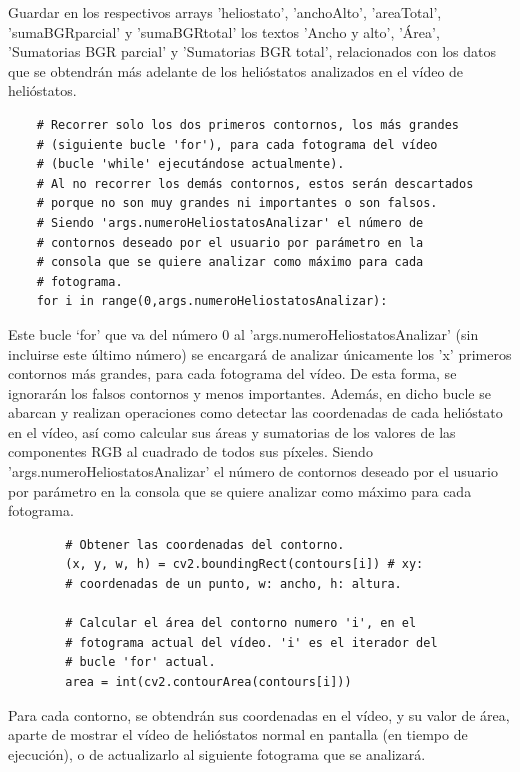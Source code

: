     Guardar en los respectivos arrays 'heliostato', 'anchoAlto', 'areaTotal', 'sumaBGRparcial' y 'sumaBGRtotal' los textos 'Ancho y alto', 'Área', 'Sumatorias BGR parcial' y 'Sumatorias BGR total', relacionados con los datos que se obtendrán más adelante de los helióstatos analizados en el vídeo de helióstatos.\\[20pt]

\begin{lstlisting}
    # Recorrer solo los dos primeros contornos, los más grandes
    # (siguiente bucle 'for'), para cada fotograma del vídeo
    # (bucle 'while' ejecutándose actualmente).
    # Al no recorrer los demás contornos, estos serán descartados
    # porque no son muy grandes ni importantes o son falsos.
    # Siendo 'args.numeroHeliostatosAnalizar' el número de
    # contornos deseado por el usuario por parámetro en la
    # consola que se quiere analizar como máximo para cada
    # fotograma.
    for i in range(0,args.numeroHeliostatosAnalizar):
\end{lstlisting}

Este bucle ‘for’ que va del número 0 al 'args.numeroHeliostatosAnalizar' (sin incluirse este último número) se encargará de analizar únicamente los 'x' primeros contornos más grandes, para cada fotograma del vídeo. De esta forma, se ignorarán los falsos contornos y menos importantes. Además, en dicho bucle se abarcan y realizan operaciones como detectar las coordenadas de cada helióstato en el vídeo, así como calcular sus áreas y sumatorias de los valores de las componentes RGB al cuadrado de todos sus píxeles. Siendo 'args.numeroHeliostatosAnalizar' el número de contornos deseado por el usuario por parámetro en la consola que se quiere analizar como máximo para cada fotograma.\\[20pt]        
        
\begin{lstlisting}
        # Obtener las coordenadas del contorno.
        (x, y, w, h) = cv2.boundingRect(contours[i]) # xy:
        # coordenadas de un punto, w: ancho, h: altura.

        # Calcular el área del contorno numero 'i', en el
        # fotograma actual del vídeo. 'i' es el iterador del
        # bucle 'for' actual.
        area = int(cv2.contourArea(contours[i]))
\end{lstlisting}
        
Para cada contorno, se obtendrán sus coordenadas en el vídeo, y su valor de área, aparte de mostrar el vídeo de helióstatos normal en pantalla (en tiempo de ejecución), o de actualizarlo al siguiente fotograma que se analizará.

